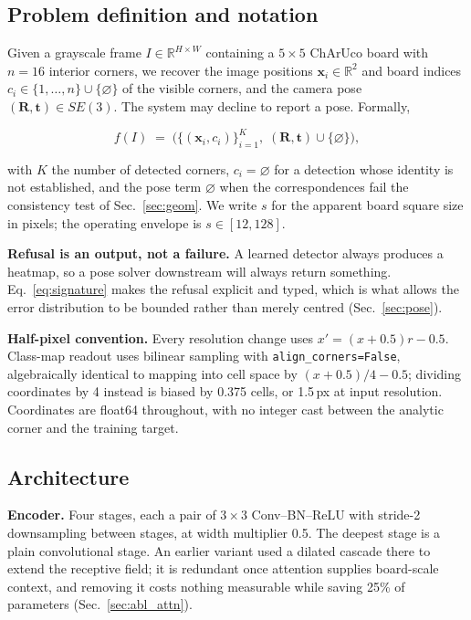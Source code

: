 \documentclass[10pt,twocolumn,letterpaper]{article}
\begin{document}
\subsection{Problem definition and notation}
\label{sec:formulation}

Given a grayscale frame $I \in \mathbb{R}^{H \times W}$ containing a $5\times5$ ChArUco board with
$n = 16$ interior corners, we recover the image positions $\mathbf{x}_i \in \mathbb{R}^2$ and board
indices $c_i \in \{1,\dots,n\} \cup \{\varnothing\}$ of the visible corners, and the camera pose
$(\mathbf{R},\mathbf{t}) \in SE(3)$. The system may decline to report a pose. Formally,

\begin{equation}
f(I) \;=\; \big(\{(\mathbf{x}_i, c_i)\}_{i=1}^{K},\; (\mathbf{R},\mathbf{t}) \cup \{\varnothing\}\big),
\label{eq:signature}
\end{equation}

with $K$ the number of detected corners, $c_i = \varnothing$ for a detection whose identity is not
established, and the pose term $\varnothing$ when the correspondences fail the consistency test of
Sec.~\ref{sec:geom}. We write $s$ for the apparent board square size in pixels; the operating
envelope is $s \in [12,128]$.

\textbf{Refusal is an output, not a failure.} A learned detector always produces a heatmap, so a
pose solver downstream will always return something. Eq.~\ref{eq:signature} makes the refusal
explicit and typed, which is what allows the error distribution to be bounded rather than merely
centred (Sec.~\ref{sec:pose}).

\textbf{Half-pixel convention.} Every resolution change uses $x' = (x + 0.5)r - 0.5$. Class-map
readout uses bilinear sampling with \texttt{align\_corners=False}, algebraically identical to
mapping into cell space by $(x+0.5)/4 - 0.5$; dividing coordinates by 4 instead is biased by 0.375
cells, or 1.5\,px at input resolution. Coordinates are float64 throughout, with no integer cast
between the analytic corner and the training target.

\subsection{Architecture}
\label{sec:arch}

\textbf{Encoder.} Four stages, each a pair of $3\times3$ Conv--BN--ReLU with stride-2 downsampling
between stages, at width multiplier 0.5. The deepest stage is a plain convolutional stage. An
earlier variant used a dilated cascade there to extend the receptive field; it is redundant once
attention supplies board-scale context, and removing it costs nothing measurable while saving 25\%
of parameters (Sec.~\ref{sec:abl_attn}).
\end{document}
